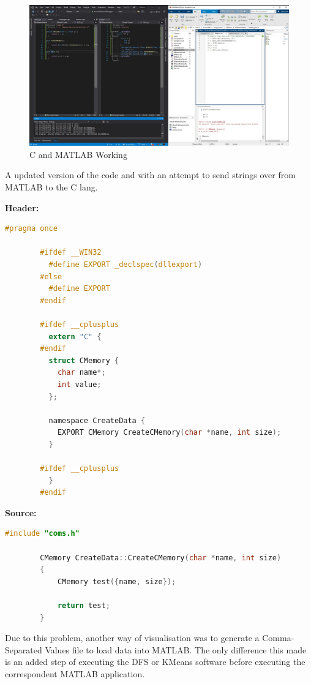 \documentclass[conference]{IEEEtran}
\begin{document}
      \begin{figure}[ht]
        \centering
        \includegraphics[width=1\columnwidth]{Figures/fig1.jpg}
        \caption{C and MATLAB Working}
        \label{fig:throughput}
      \end{figure}

      A updated version of the code and with an attempt to send strings over from MATLAB to the C lang.

      \textbf{Header:}
      \begin{lstlisting}[language=c]
        #pragma once

        #ifdef __WIN32
          #define EXPORT _declspec(dllexport)
        #else
          #define EXPORT
        #endif

        #ifdef __cplusplus
          extern "C" {
        #endif
          struct CMemory {
            char name*;
            int value;
          };

          namespace CreateData {
            EXPORT CMemory CreateCMemory(char *name, int size);
          }

        #ifdef __cplusplus
          }
        #endif
      \end{lstlisting}

      \textbf{Source:}
      \begin{lstlisting}[language=c++]
        #include "coms.h"

        CMemory CreateData::CreateCMemory(char *name, int size)
        {
            CMemory test({name, size});

            return test;
        }
      \end{lstlisting}

      Due to this problem, another way of visualisation was to generate a Comma-Separated Values file to load data into MATLAB. The only difference this made is an added step of executing the DFS or KMeans software before executing the correspondent MATLAB application.
\end{document}
